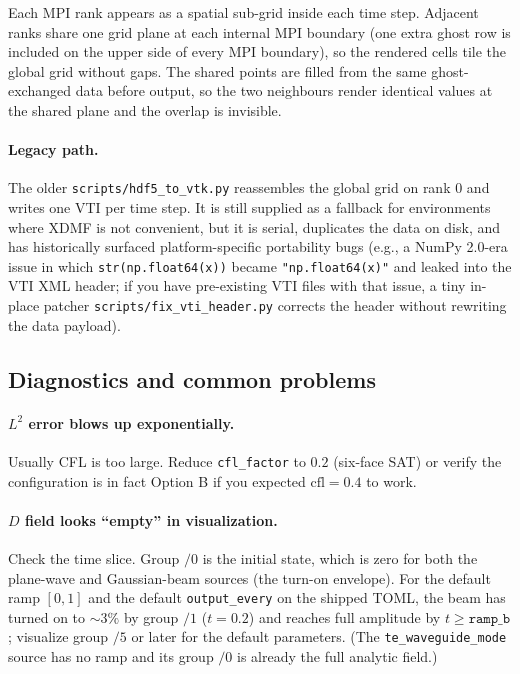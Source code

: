 \documentclass[11pt]{article}
\begin{document}
Each MPI rank appears as a spatial sub-grid inside each time step.
Adjacent ranks share one grid plane at each internal MPI boundary
(one extra ghost row is included on the upper side of every MPI
boundary), so the rendered cells tile the global grid without gaps.
The shared points are filled from the same ghost-exchanged data
before output, so the two neighbours render identical values at the
shared plane and the overlap is invisible.

\paragraph{Legacy path.} The older \texttt{scripts/hdf5\_to\_vtk.py}
reassembles the global grid on rank 0 and writes one VTI per time
step. It is still supplied as a fallback for environments where XDMF
is not convenient, but it is serial, duplicates the data on disk, and
has historically surfaced platform-specific portability bugs (e.g., a
NumPy 2.0-era issue in which \texttt{str(np.float64(x))} became
\texttt{"np.float64(x)"} and leaked into the VTI XML header; if you
have pre-existing VTI files with that issue, a tiny in-place patcher
\texttt{scripts/fix\_vti\_header.py} corrects the header without
rewriting the data payload).

\subsection{Diagnostics and common problems}

\paragraph{$L^2$ error blows up exponentially.} Usually CFL is too
large. Reduce \texttt{cfl\_factor} to $0.2$ (six-face SAT) or verify
the configuration is in fact Option B if you expected $\mathrm{cfl} = 0.4$
to work.

\paragraph{$D$ field looks ``empty'' in visualization.} Check the time
slice. Group $/0$ is the initial state, which is zero for both the
plane-wave and Gaussian-beam sources (the turn-on envelope). For
the default ramp $[0, 1]$ and the default \texttt{output\_every} on
the shipped TOML, the beam has turned on to $\sim 3\%$ by group
$/1$ ($t = 0.2$) and reaches full amplitude by $t \geq \mathtt{ramp\_b}$;
visualize group $/5$ or later for the default parameters. (The
\texttt{te\_waveguide\_mode} source has no ramp and its group $/0$
is already the full analytic field.)
\end{document}
